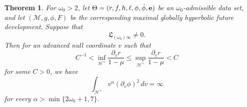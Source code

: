 \documentclass[10pt, reqno]{amsart}
\newtheorem{theorem}{Theorem}[section]
\theoremstyle{definition}
\theoremstyle{remark}
\numberwithin{equation}{section}
\newcommand{\ud}{d}
\newcommand{\rd}{\partial}
\newcommand{\0}{\emptyset}
\newcommand{\alp}{\alpha}
\newcommand{\Tht}{\Theta}
\newcommand{\omg}{\omega}
\newcommand{\bfe}{{\bf e}}
\newcommand{\calH}{\mathcal H}
\newcommand{\calM}{\mathcal M}
\newcommand{\EH}{\calH^{+}}
\newcommand{\e}{\bfe}							%
\begin{document}
\begin{theorem} \label{thm:blowup}
For $\omg_{0} > 2$, let $\Tht = (r, f, h, \ell, \phi, \dot{\phi}, \e)$ be an $\omg_{0}$-admissible data set, and let $(\calM, g, \phi, F)$ be the corresponding maximal globally hyperbolic future development. Suppose that
\begin{equation*}
	\mathfrak{L}_{(\omg_{0}) \infty} \neq 0.
\end{equation*}
Then for an advanced null coordinate $v$ such that
\begin{equation*}
	C^{-1} < \inf_{\EH} \frac{\rd_{v} r}{1-\mu} \leq \sup_{\EH} \frac{\rd_{v} r}{1-\mu} < C
\end{equation*}
for some $C > 0$, we have
\begin{equation*}
	\int_{\EH} v^{\alp} (\rd_{v} \phi)^{2} \, \ud v = \infty
\end{equation*}
for every $\alp >  \min\{ 2 \omg_{0} + 1 , 7 \}$. 
\end{theorem}
\end{document}
